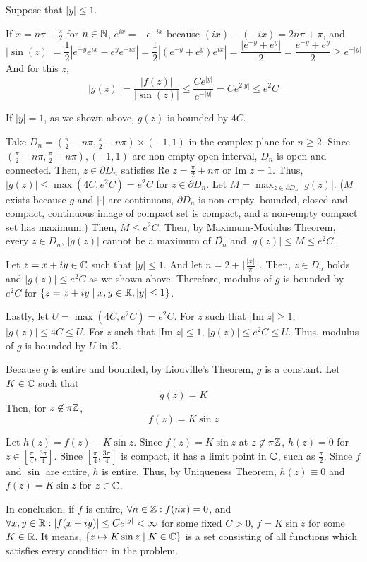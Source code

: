 Suppose that \(|y| \le 1\).

If \(x = n\pi + \frac{\pi}{2}\) for \(n \in \mathbb{N}\), \(e^{ix} = -e^{-ix}\) because \((ix) - (-ix) = 2n\pi + \pi\), and
\[|\sin(z)|
  = \frac{1}{2} \left| e^{-y} e^{ix} - e^{y} e^{-ix} \right|
  = \frac{1}{2} \left| (e^{-y} + e^{y}) e^{ix} \right|
  = \frac{|e^{-y} + e^{y}|}{2}
  = \frac{e^{-y} + e^y}{2} \ge e^{-|y|} \]
And for this \(z\),
\[|g(z)|
  = \frac{|f(z)|}{|\sin (z)|}
  \le \frac{Ce^{|y|}}{e^{-|y|}}
  = C e^{2|y|}
  \le e^2 C\]

If \(|y| = 1\), as we shown above, \(g(z)\) is bounded by \(4C\).

Take \(D_n = (\frac{\pi}{2} - n\pi, \frac{\pi}{2} + n\pi) \times (-1, 1)\) in the complex plane for \(n \ge 2\).
Since \((\frac{\pi}{2} - n\pi, \frac{\pi}{2} + n\pi), (-1, 1)\) are non-empty open interval, \(D_n\) is open and connected.
Then, \(z \in \partial D_n\) satisfies \(\text{Re } z = \frac{\pi}{2} \pm n\pi\)
or \(\text{Im } z = 1\).
Thus, \(|g(z)| \le \max(4C, e^2C) = e^2C\) for \(z \in \partial D_n\).
Let \(M = \max_{z \in \partial D_n} |g(z)|\).
(\(M\) exists because \(g\) and \(|\cdot|\) are continuous, \(\partial D_n\) is non-empty, bounded, closed and compact, continuous image of compact set is compact, and a non-empty compact set has maximum.)
Then, \(M \le e^2C\).
Then, by Maximum-Modulus Theorem,
every \(z \in D_n\), \(|g(z)|\) cannot be a maximum of \(\overline{D_n}\) and \(|g(z)| \le M \le e^2C\).

Let \(z = x + iy \in \mathbb{C}\) such that \(|y| \le 1\).
And let \(n = 2 + \lceil \frac{|x|}{\pi} \rceil\).
Then, \(z \in D_n\) holds and \(|g(z)| \le e^2C\) as we shown above.
Therefore, modulus of \(g\) is bounded by \(e^2C\) for \(\{z = x + iy \mid x, y \in \mathbb{R}, |y| \le 1\}\).

Lastly, let \(U = \max(4C, e^2C) = e^2C\).
For \(z\) such that \(\left|\text{Im } z\right| \ge 1\), \(|g(z)| \le 4C \le U\).
For \(z\) such that \(\left|\text{Im } z\right| \le 1\), \(|g(z)| \le e^2C \le U\).
Thus, modulus of \(g\) is bounded by \(U\) in \(\mathbb{C}\).

Because \(g\) is entire and bounded,
by Liouville's Theorem,
\(g\) is a constant.
Let \(K \in \mathbb{C}\) such that
\[g(z) = K\]
Then, for \(z \not\in \pi\mathbb{Z}\),
\[f(z) = K \sin z\]

Let \(h(z) = f(z) - K\sin z\).
Since \(f(z) = K \sin z\) at \(z \not\in \pi\mathbb{Z}\),
\(h(z) = 0\) for \(z \in [\frac{\pi}{4}, \frac{3\pi}{4}]\).
Since \([\frac{\pi}{4}, \frac{3\pi}{4}]\) is compact,
it has a limit point in \(\mathbb{C}\),
such as \(\frac{\pi}{2}\).
Since \(f\) and \(\sin\) are entire, \(h\) is entire.
Thus, by Uniqueness Theorem, \(h(z) \equiv 0\) and \(f(z) = K\sin z\) for \(z \in \mathbb{C}\).

In conclusion, if \(f\) is entire, \(\forall n \in \mathbb{Z}: f(n\pi) = 0\), and \(\forall x, y \in \mathbb{R}: |f(x + iy)| \le C e^{|y|} < \infty\) for some fixed \(C > 0\), \(f = K\sin z\) for some \(K \in \mathbb{R}\).
It means, \(\{z \mapsto K \sin z \mid K \in \mathbb{C}\}\)
is a set consisting of all functions which satisfies every condition in the problem.
\qedsq